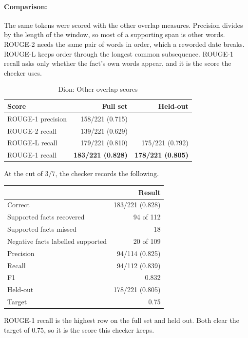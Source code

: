 \documentclass[12pt,a4paper]{article}
\begin{document}
\paragraph{Comparison:}

The same tokens were scored with the other overlap measures. Precision divides by the length of the window, so most of a supporting span is other words. ROUGE-2 needs the same pair of words in order, which a reworded date breaks. ROUGE-L keeps order through the longest common subsequence. ROUGE-1 recall asks only whether the fact's own words appear, and it is the score the checker uses.

\begin{table}[H]
\centering
\small
\begin{tabular}{@{}lrr@{}}
\toprule
Score & Full set & Held-out \\
\midrule
ROUGE-1 precision & 158/221 (0.715) & \\
ROUGE-2 recall & 139/221 (0.629) & \\
ROUGE-L recall & 179/221 (0.810) & 175/221 (0.792) \\
ROUGE-1 recall & \textbf{183/221 (0.828)} & \textbf{178/221 (0.805)} \\
\bottomrule
\end{tabular}
\caption{Dion: Other overlap scores}
\label{tab:rouge}
\end{table}

At the cut of \(3/7\), the checker records the following.

\begin{center}
\small
\begin{tabular}{@{}lr@{}}
\toprule
 & Result \\
\midrule
Correct & 183/221 (0.828) \\
Supported facts recovered & 94 of 112 \\
Supported facts missed & 18 \\
Negative facts labelled supported & 20 of 109 \\
Precision & 94/114 (0.825) \\
Recall & 94/112 (0.839) \\
F1 & 0.832 \\
Held-out & 178/221 (0.805) \\
Target & 0.75 \\
\bottomrule
\end{tabular}
\end{center}

ROUGE-1 recall is the highest row on the full set and held out. Both clear the target of 0.75, so it is the score this checker keeps.
\end{document}
